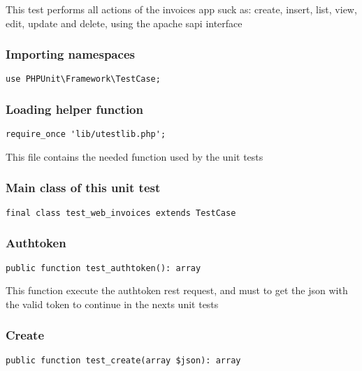 \documentclass[a4paper]{article}
\begin{document}
This test performs all actions of the invoices app suck as: create, insert,
list, view, edit, update and delete, using the apache sapi interface

\hypertarget{toc405}{}
\subsubsection{Importing namespaces}

\begin{lstlisting}
use PHPUnit\Framework\TestCase;
\end{lstlisting}

\hypertarget{toc406}{}
\subsubsection{Loading helper function}

\begin{lstlisting}
require_once 'lib/utestlib.php';
\end{lstlisting}

This file contains the needed function used by the unit tests

\hypertarget{toc407}{}
\subsubsection{Main class of this unit test}

\begin{lstlisting}
final class test_web_invoices extends TestCase
\end{lstlisting}

\hypertarget{toc408}{}
\subsubsection{Authtoken}

\begin{lstlisting}
public function test_authtoken(): array
\end{lstlisting}

This function execute the authtoken rest request, and must to get the
json with the valid token to continue in the nexts unit tests

\hypertarget{toc409}{}
\subsubsection{Create}

\begin{lstlisting}
public function test_create(array $json): array
\end{lstlisting}
\end{document}

